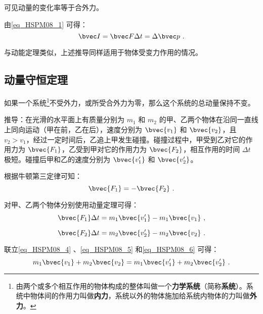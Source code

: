 可见动量的变化率等于合外力。

由\autoref{eq_HSPM08_1} 可得：
\begin{equation}\label{eq_HSPM08_3}
\bvec I=\bvec F\Delta t=\Delta \bvec p~.
\end{equation}

与动能定理类似，上述推导同样适用于物体受变力作用的情况。

\subsection{动量守恒定理}

如果一个系统\footnote{由两个或多个相互作用的物体构成的整体叫做一个\textbf{力学系统}（简称\textbf{系统}）。系统中物体间的作用力叫做\textbf{内力}，系统以外的物体施加给系统内物体的力叫做\textbf{外力}。}不受外力，或所受合外力为零，那么这个系统的总动量保持不变。

推导：在光滑的水平面上有质量分别为 $m_1$ 和 $m_2$ 的甲、乙两个物体在沿同一直线上同向运动（甲在前，乙在后），速度分别为 $\bvec{v_1}$ 和 $\bvec{v_2}$，且 $v_2>v_1$，经过一定时间后，乙追上甲发生碰撞。碰撞过程中，甲受到乙对它的作用力为 $\bvec {F_1}$，乙受到甲对它的作用力为 $\bvec {F_2}$，相互作用的时间 $\Delta t$ 极短。碰撞后甲和乙的速度分别为 $\bvec{v_1'}$ 和 $\bvec{v_2'}$。

根据牛顿第三定律可知：
\begin{equation}\label{eq_HSPM08_4}
\bvec {F_1}=-\bvec{F_2}~.
\end{equation}

对甲、乙两个物体分别使用动量定理可得：
\begin{equation}\label{eq_HSPM08_5}
\bvec{F_1}\Delta t=m_1\bvec{v_1'}-m_1\bvec{v_1}~,
\end{equation}

\begin{equation}\label{eq_HSPM08_6}
\bvec{F_2}\Delta t=m_2\bvec{v_2'}-m_2\bvec{v_2}~.
\end{equation}

联立\autoref{eq_HSPM08_4} 、\autoref{eq_HSPM08_5} 和\autoref{eq_HSPM08_6} 可得：
\begin{equation}
m_1\bvec{v_1}+ m_2\bvec{v_2}= m_1\bvec{v_1'}+ m_2\bvec{v_2'}~.
\end{equation}



